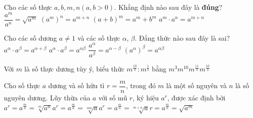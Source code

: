 \begin{ex}%
	 Cho các số thực $a,b,m,n\left(a,b>0\right)$. Khẳng định nào sau đây là \textbf{đúng}?
	 \choice
		 {$\dfrac{a^m}{a^n}=\sqrt{a^m}$}
		{$\left(a^m\right)^n=a^{m+n}$} 
		 {$\left(a+b\right)^m=a^m+b^m$}
		{\True $a^m\cdot a^n=a^{m+n}$} 
\end{ex}

\begin{ex}%
	Cho các số dương $a\ne 1$ và các số thực $\alpha $, $\beta $.  Đẳng thức nào sau đây là sai?
	\choice 
		 {$a^\alpha\cdot a^\beta=a^{\alpha+\beta}$}
		{\True $a^\alpha\cdot  a^\beta=a^{\alpha\beta}$}
		{$\dfrac{a^\alpha}{a^\beta}=a^{\alpha-\beta}$} 
		{$\left(a^\alpha\right)^\beta=a^{\alpha\beta}$} 
	 \loigiai{
	 }
\end{ex}

\begin{ex}%
	Với $m$ là số  thực dương tùy ý, biểu thức $m^{\tfrac{10}{3}}:m^{\tfrac{1}{3}}$ bằng
	\choice 
		{\True  $m^3$}{$m^{10}$}{$m^{\tfrac{11}{3}}$}{$m^{\tfrac{10}{3}}$}
\end{ex}

\begin{ex}%
	Cho số thực $a$ dương và số  hữu tì $r=\dfrac{m}{n}$, trong đó $m$ là một số nguyên và $n$ là số nguyên dương. Lũy thừa của $a$ với số mũ $r$, ký hiệu $a^r$, được xác định bời
	 \choice
		 {$a^r=a^{\frac{m}{n}}=\sqrt[m]{a^n}$}{$a^r=a^{\frac{m}{n}}=\sqrt[m n]{a}$}{$a^r=a^{\frac{m}{n}}=\sqrt[m+n]{a}$}{\True $r=a^{\frac{m}{n}}=\sqrt{a^m}$}
\end{ex}

